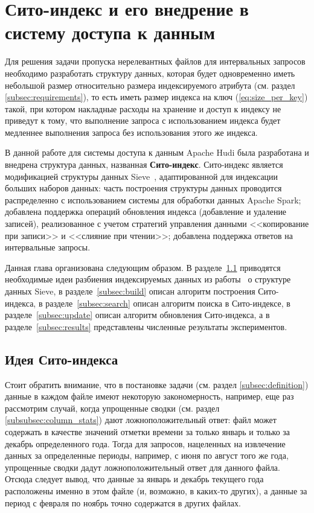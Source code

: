 \section{Сито-индекс и его внедрение в систему доступа к данным}

Для решения задачи пропуска нерелевантных файлов для интервальных запросов необходимо разработать структуру данных, которая будет одновременно иметь небольшой размер относительно размера индексируемого атрибута (см. раздел \ref{subsec:requirements}), то есть иметь размер индекса на ключ (\ref{eq:size_per_key}) такой, при котором накладные расходы на хранение и доступ к индексу не приведут к тому, что выполнение запроса с использованием индекса будет медленнее выполнения запроса без использования этого же индекса.

В данной работе для системы доступа к данным Apache Hudi была разработана и внедрена структура данных, названная \textbf{Сито-индекс}. Сито-индекс является модификацией структуры данных Sieve~\cite{Sieve}, адаптированной для индексации больших наборов данных: часть построения структуры данных проводится распределенно с использованием системы для обработки данных Apache Spark; добавлена поддержка операций обновления индекса (добавление и удаление записей), реализованное с учетом стратегий управления данными {<<копирование при записи>>} и {<<слияние при чтении>>}; добавлена поддержка ответов на интервальные запросы. 

Данная глава организована следующим образом. В разделе~\ref{subsec:implementation} приводятся необходимые идеи разбиения индексируемых данных из работы~\cite{Sieve} о структуре данных Sieve, в разделе~\ref{subsec:build} описан алгоритм построения Сито-индекса, в разделе~\ref{subsec:search} описан алгоритм поиска в Сито-индексе, в разделе~\ref{subsec:update} описан алгоритм обновления Сито-индекса, а в разделе~\ref{subsec:results} представлены численные результаты экспериментов.

\subsection{Идея Сито-индекса}\label{subsec:implementation}

Стоит обратить внимание, что в постановке задачи (см. раздел  \ref{subsec:definition}) данные в каждом файле имеют некоторую закономерность, например, еще раз рассмотрим случай, когда упрощенные сводки (см. раздел \ref{subsubsec:column_stats}) дают ложноположительный ответ: файл может содержать в качестве значений отметки времени за только январь и только за декабрь определенного года.
Тогда для запросов, нацеленных на извлечение данных за определенные периоды, например, с июня по август того же года, упрощенные сводки дадут ложноположительный ответ для данного файла. Отсюда следует вывод, что данные за январь и декабрь текущего года расположены именно в этом файле (и, возможно, в каких-то других), а данные за период с февраля по ноябрь точно содержатся в других файлах.

